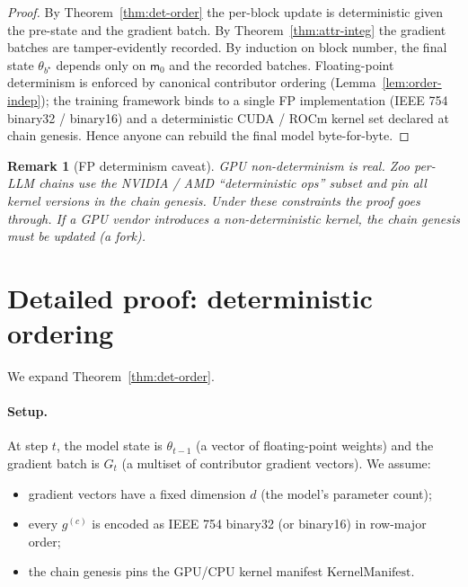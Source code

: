 \documentclass[11pt]{article}
\newtheorem{remark}{Remark}
\begin{document}
\begin{proof}
By Theorem~\ref{thm:det-order} the per-block update is deterministic
given the pre-state and the gradient batch. By
Theorem~\ref{thm:attr-integ} the gradient batches are
tamper-evidently recorded. By induction on block number, the final
state $\theta_{b^\star}$ depends only on $\mathsf{m}_0$ and the
recorded batches. Floating-point determinism is enforced by
canonical contributor ordering (Lemma~\ref{lem:order-indep}); the
training framework binds to a single FP implementation
(IEEE 754 binary32 / binary16) and a deterministic CUDA / ROCm
kernel set declared at chain genesis. Hence anyone can rebuild the
final model byte-for-byte.
\end{proof}

\begin{remark}[FP determinism caveat]
GPU non-determinism is real. Zoo per-LLM chains use the
NVIDIA / AMD ``deterministic ops'' subset and pin all kernel
versions in the chain genesis. Under these constraints the
proof goes through. If a GPU vendor introduces a non-deterministic
kernel, the chain genesis must be updated (a fork).
\end{remark}

\section{Detailed proof: deterministic ordering}
\label{sec:detail-order}

We expand Theorem~\ref{thm:det-order}.

\paragraph{Setup.}
At step $t$, the model state is $\theta_{t-1}$ (a vector of
floating-point weights) and the gradient batch is $G_t$ (a multiset
of contributor gradient vectors). We assume:
\begin{itemize}[nosep]
  \item gradient vectors have a fixed dimension $d$ (the model's
        parameter count);
  \item every $g^{(c)}$ is encoded as IEEE 754 binary32 (or
        binary16) in row-major order;
  \item the chain genesis pins the GPU/CPU kernel manifest
        $\mathrm{KernelManifest}$.
\end{itemize}
\end{document}
